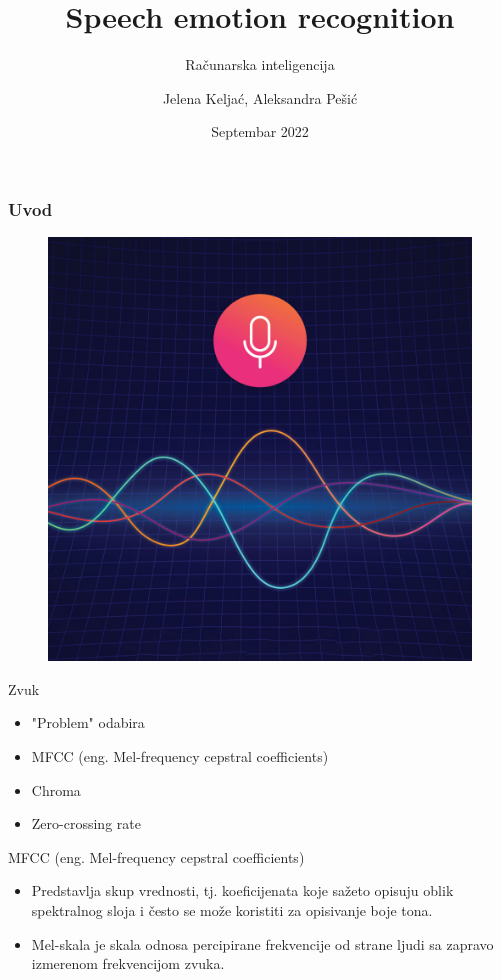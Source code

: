 \documentclass{beamer}
\title{Speech emotion recognition}
\subtitle{Računarska inteligencija}
\author{Jelena Keljać, Aleksandra Pešić}
\institute{Matematički fakultet}
\date{Septembar 2022}
\begin{document}
\begin{frame}
\titlepage
\end{frame}
    
\begin{frame}
\frametitle{Uvod}
\begin{figure}[t]
\centering
\includegraphics[scale=0.2]{im1.jpg}
\end{figure}
\end{frame}

\begin{frame}{Zvuk}
\begin{itemize}
    \item "Problem" odabira 
    \item MFCC (eng. Mel-frequency cepstral coefficients)
    \item Chroma
    \item Zero-crossing rate
\end{itemize}
\end{frame}

\begin{frame}{MFCC (eng. Mel-frequency cepstral coefficients)}
\begin{itemize}
    \item Predstavlja skup vrednosti, tj. koeficijenata koje sažeto opisuju oblik spektralnog sloja i često se može koristiti za opisivanje boje tona. 
     \item Mel-skala je skala odnosa percipirane frekvencije od strane ljudi sa zapravo izmerenom frekvencijom zvuka.
\end{itemize}
\end{frame}
\end{document}
